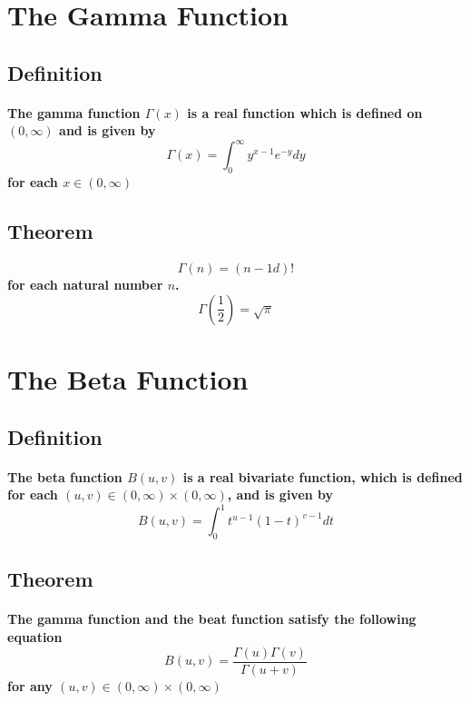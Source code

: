 \documentclass[titlepage]{article}
\begin{document}
    \section{The Gamma Function}
        \subsection*{Definition}
            \paragraph{
                The gamma function $\Gamma(x)$ is a real function which is defined on $(0,\infty)$ and is given by
                $$\Gamma(x)=\int_0^\infty y^{x-1}e^{-y}dy$$
                for each $x\in (0,\infty)$
            }
        \subsection*{Theorem}
            \paragraph{
                $$\Gamma(n)=(n-1d)!$$
                for each natural number $n$.
                $$\Gamma(\frac{1}{2})=\sqrt{\pi}$$
            }
    \section{The Beta Function}
        \subsection*{Definition}
            \paragraph{
                The beta function $B(u,v)$ is a real bivariate function, which is defined for each $(u,v)\in (0,\infty)\times(0,\infty)$, and is given by 
                $$B(u,v)=\int_0^1t^{u-1}(1-t)^{v-1}dt$$
            }
        \subsection*{Theorem}
            \paragraph{
                The gamma function and the beat function satisfy the following equation
                $$B(u,v)=\frac{\Gamma(u)\Gamma(v)}{\Gamma(u+v)}$$
                for any $(u,v)\in (0,\infty)\times(0,\infty)$
            }
            
\end{document}
